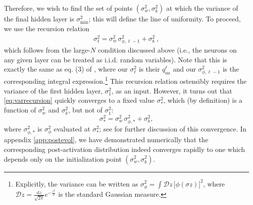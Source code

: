 Therefore, we wish to find the set of points $(\sigma_w^2,\sigma_b^2)$ at which the variance of the final hidden layer is $\sigma_\mathrm{min}^2$; this  will define the line of uniformity. To proceed, we use the recursion relation
%
\begin{align} \label{eq:varrecursion}
	\sigma_{\ell}^{2} = \sigma_{w}^{2} \, \sigma_{\phi , \ell -1}^{2} + \sigma_{b}^{2}~,
\end{align}
%
which follows from the large-$N$ condition discussed above (i.e., the neurons on any given layer can be treated as i.i.d. random variables). Note that this is exactly the same as eq. (3) of \cite{2016arXiv161101232S}, where our $\sigma_{\ell}^{2}$ is their $q_{aa}^{\ell}$ and our $\sigma_{\phi, \ell -1}^{2}$ is the corresponding integral expression.\footnote{Explicitly, the variance can be written as $\sigma_{\phi}^{2} = \int \mathcal{D} z \, \bigl[ \phi ( \sigma z ) \bigr]^2$, where $\mathcal{D}z=\tfrac{\mathrm{d} z}{\sqrt{2\pi}}e^{-\frac{z^2}{2}}$ is the standard Gaussian measure.\label{ft:gauss}} This recursion relation ostensibly requires the variance of the first hidden layer, $\sigma_1^2$, as an input. However, it turns out that \eqref{eq:varrecursion} quickly converges to a fixed value $\sigma_{*}^{2}$, which (by definition) is a function of $\sigma_{w}^{2}$ and $\sigma_{b}^{2}$, but not of $\sigma_{1}^{2}$:
%
\begin{equation} \label{eq:sigmastar}
	\sigma_{*}^{2} = \sigma_{w}^{2} \, \sigma_{\phi , *}^{2} + \sigma_{b}^{2},
\end{equation}
%
where $\sigma_{\phi, *}^{2}$ is $\sigma_{\phi}^{2}$ evaluated at $\sigma_{*}^{2}$; see \cite{arxiv.1606.05340} for further discussion of this convergence. In appendix \ref{app:postevol}, we have demonstrated numerically that the corresponding post-activation distribution indeed converges rapidly to one which depends only on the initialization point $(\sigma_w^2, \sigma_b^2)$.

